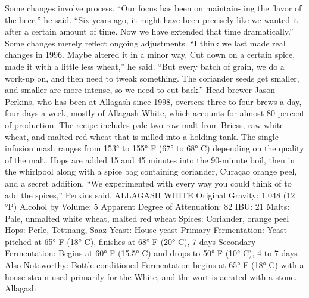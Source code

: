 \documentclass[a4paper,parskip=half]{scrartcl}
\begin{document}
Some changes involve process. “Our focus has been on maintain-
ing the flavor of the beer,” he said. “Six years ago, it might have been
precisely like we wanted it after a certain amount of time. Now we have
extended that time dramatically.”
Some changes merely reflect ongoing adjustments. “I think we last made
real changes in 1996. Maybe altered it in a minor way. Cut down on a certain
spice, made it with a little less wheat,” he said. “But every batch of grain, we
do a work-up on, and then need to tweak something. The coriander seeds get
smaller, and smaller are more intense, so we need to cut back.”
Head brewer Jason Perkins, who has been at Allagash since 1998,
oversees three to four brews a day, four days a week, mostly of Allagash
White, which accounts for almost 80 percent of production. The recipe
includes pale two-row malt from Briess, raw white wheat, and malted
red wheat that is milled into a holding tank.
The single-infusion mash ranges from 153° to 155° F (67° to 68° C)
depending on the quality of the malt. Hops are added 15 and 45 minutes
into the 90-minute boil, then in the whirlpool along with a spice bag
containing coriander, Curaçao orange peel, and a secret addition. “We
experimented with every way you could think of to add the spices,”
Perkins said.
ALLAGASH WHITE
Original Gravity: 1.048 (12 °P)
Alcohol by Volume: 5%
Apparent Degree of Attenuation: 82%
IBU: 21
Malts: Pale, unmalted white wheat, malted red wheat
Spices: Coriander, orange peel
Hops: Perle, Tettnang, Saaz
Yeast: House yeast
Primary Fermentation: Yeast pitched at 65° F (18° C), finishes at 68° F (20°
C), 7 days
Secondary Fermentation: Begins at 60° F (15.5° C) and drops to 50° F (10°
C), 4 to 7 days
Also Noteworthy: Bottle conditioned
Fermentation begins at 65° F (18° C) with a house strain used
primarily for the White, and the wort is aerated with a stone. Allagash

\parencite[58]{Hieronymus2010}
\end{document}

